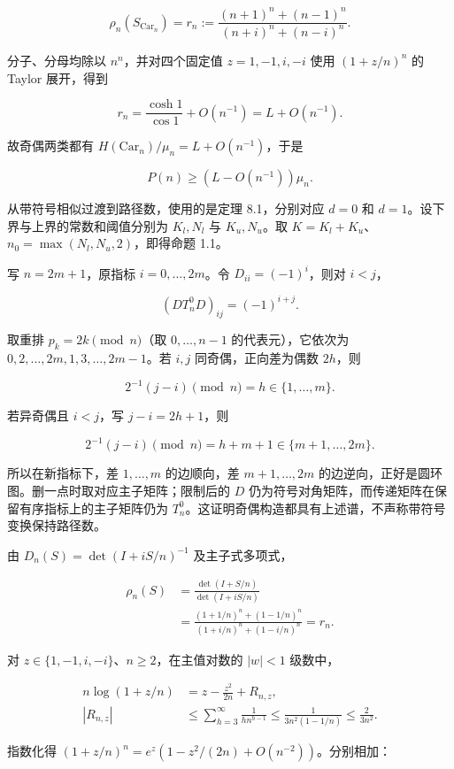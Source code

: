 \documentclass[11pt,a4paper]{article}
\begin{document}
\[\rho_n(S_{\mathrm{Car}_n})
=r_n:=\frac{(n+1)^n+(n-1)^n}{(n+i)^n+(n-i)^n}.\]

分子、分母均除以 \(n^n\)，并对四个固定值 \(z=1,-1,i,-i\) 使用 \((1+z/n)^n\) 的 Taylor 展开，得到

\[r_n=\frac{\cosh1}{\cos1}+O(n^{-1})=L+O(n^{-1}).\]

故奇偶两类都有 \(H(\mathrm{Car}_n)/\mu_n=L+O(n^{-1})\)，于是

\[P(n)\ge(L-O(n^{-1}))\mu_n.\]

从带符号相似过渡到路径数，使用的是定理 8.1，分别对应 \(d=0\) 和 \(d=1\)。设下界与上界的常数和阈值分别为 \(K_l,N_l\) 与 \(K_u,N_u\)。取 \(K=K_l+K_u\)、\(n_0=\max(N_l,N_u,2)\)，即得命题 1.1。

写 \(n=2m+1\)，原指标 \(i=0,\ldots,2m\)。令 \(D_{ii}=(-1)^i\)，则对 \(i<j\)，

\[(DT_n^0D)_{ij}=(-1)^{i+j}.\]

取重排 \(p_k=2k\pmod n\)（取 \(0,\ldots,n-1\) 的代表元），它依次为 \(0,2,\ldots,2m,1,3,\ldots,2m-1\)。若 \(i,j\) 同奇偶，正向差为偶数 \(2h\)，则

\[2^{-1}(j-i)\pmod n=h\in\{1,\ldots,m\}.\]

若异奇偶且 \(i<j\)，写 \(j-i=2h+1\)，则

\[2^{-1}(j-i)\pmod n=h+m+1\in\{m+1,\ldots,2m\}.\]

所以在新指标下，差 \(1,\ldots,m\) 的边顺向，差 \(m+1,\ldots,2m\) 的边逆向，正好是圆环图。删一点时取对应主子矩阵；限制后的 \(D\) 仍为符号对角矩阵，而传递矩阵在保留有序指标上的主子矩阵仍为 \(T_n^0\)。这证明奇偶构造都具有上述谱，不声称带符号变换保持路径数。

由 \(D_n(S)=\det(I+iS/n)^{-1}\) 及主子式多项式，

\[\begin{aligned}
\rho_n(S)&=\frac{\det(I+S/n)}{\det(I+iS/n)}\\
&=\frac{(1+1/n)^n+(1-1/n)^n}
{(1+i/n)^n+(1-i/n)^n}=r_n.
\end{aligned}\]

对 \(z\in\{1,-1,i,-i\}\)、\(n\ge2\)，在主值对数的 \(|w|<1\) 级数中，

\[\begin{aligned}
n\log(1+z/n)&=z-\frac{z^2}{2n}+R_{n,z},\\
|R_{n,z}|&\le\sum_{h=3}^{\infty}\frac1{h n^{h-1}}
\le\frac1{3n^2(1-1/n)}\le\frac2{3n^2}.
\end{aligned}\]

指数化得 \((1+z/n)^n=e^z(1-z^2/(2n)+O(n^{-2}))\)。分别相加：
\end{document}
